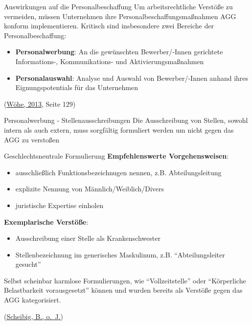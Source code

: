 \documentclass[
  10pt,
  ngerman,
  ignorenonframetext,
]{beamer}
\providecommand{\tightlist}{%
  \setlength{\itemsep}{0pt}\setlength{\parskip}{0pt}}
\begin{document}
\begin{frame}{Auswirkungen auf die Personalbeschaffung}
\protect\hypertarget{auswirkungen-auf-die-personalbeschaffung}{}
Um arbeitsrechtliche Verstöße zu vermeiden, müssen Unternehmen ihre
Personalbeschaffungsmaßnahmen AGG konform implementieren. Kritisch sind
insbesondere zwei Bereiche der Personalbeschaffung:

\begin{itemize}
\tightlist
\item
  \textbf{Personalwerbung}: An die gewünschten Bewerber/-Innen
  gerichtete Informations-, Kommunikations- und Aktivierungsmaßnahmen
\item
  \textbf{Personalauswahl}: Analyse und Auswahl von Bewerber/-Innen
  anhand ihres Eignungspotentials für das Unternehmen
\end{itemize}

(\protect\hyperlink{ref-woehe}{Wöhe, 2013}, Seite 129)
\end{frame}

\begin{frame}{Personalwerbung - Stellenausschreibungen}
\protect\hypertarget{personalwerbung---stellenausschreibungen}{}
Die Ausschreibung von Stellen, sowohl intern als auch extern, muss
sorgfältig formuliert werden um nicht gegen das AGG zu verstoßen
\end{frame}

\begin{frame}{Geschlechtsneutrale Formulierung}
\protect\hypertarget{geschlechtsneutrale-formulierung}{}
\textbf{Empfehlenswerte Vorgehensweisen}:

\begin{itemize}
\tightlist
\item
  ausschließlich Funktionsbezeichnugen nennen, z.B. Abteilungsleitung
\item
  explizite Nennung von Männlich/Weiblich/Divers
\item
  juristische Expertise einholen
\end{itemize}

\textbf{Exemplarische Verstöße}:

\begin{itemize}
\tightlist
\item
  Ausschreibung einer Stelle als Krankenschwester
\item
  Stellenbezeichnung im generisches Maskulinum, z.B. ``Abteilungsleiter
  gesucht''
\end{itemize}

Selbst scheinbar harmlose Formulierungen, wie ``Vollzeitstelle'' oder
``Körperliche Belastbarkeit vorausgesetzt'' können und wurden bereits
als Verstöße gegen das AGG kategorisiert.

(\protect\hyperlink{ref-ihk_wsb}{Scheibig, B., o.~J.})
\end{frame}
\end{document}
